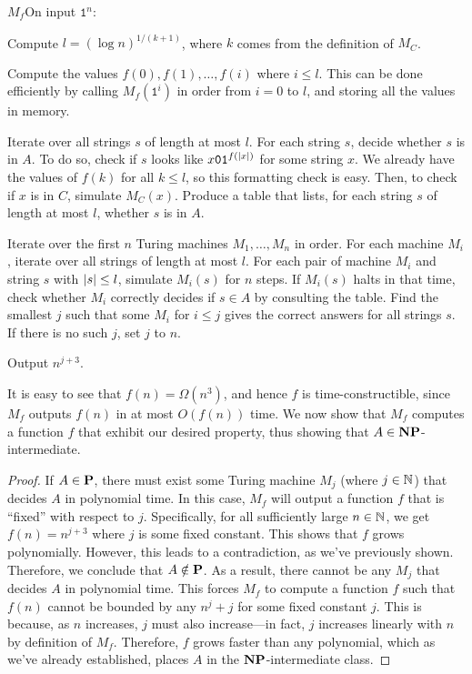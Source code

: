\documentclass[11pt,twoside=off,numbers=noenddot]{scrbook}
\begin{document}
\begin{turing}{$M_f$}{On input $\texttt{1}^n$:}
\item Compute $l = (\log n)^{1 / (k + 1)}$, where $k$ comes from the definition of $M_C$.
\item Compute the values $f(0), f(1), \dots, f(i)$ where $i \leq l$. This can be done efficiently by calling $M_f(\texttt{1}^i)$ in order from $i = 0$ to $l$, and storing all the values in memory.
\item Iterate over all strings $s$ of length at most $l$. For each string $s$, decide whether $s$ is in $A$. To do so, check if $s$ looks like $x\texttt{0}\texttt{1}^{f(| x |)}$ for some string $x$. We already have the values of $f(k)$ for all $k \leq l$, so this formatting check is easy. Then, to check if $x$ is in $C$, simulate $M_C(x)$. Produce a table that lists, for each string $s$ of length at most $l$, whether $s$ is in $A$.
\item Iterate over the first $n$ Turing machines $M_1, \dots, M_n$ in order. For each machine $M_i$, iterate over all strings of length at most $l$. For each pair of machine $M_i$ and string $s$ with $| s | \leq l$, simulate $M_i(s)$ for $n$ steps. If $M_i(s)$ halts in that time, check whether $M_i$ correctly decides if $s \in A$ by consulting the table. Find the smallest $j$ such that some $M_i$ for $i \leq j$ gives the correct answers for all strings $s$. If there is no such $j$, set $j$ to $n$.
\item Output $n^{j + 3}$.
\end{turing}

It is easy to see that $f(n) = \Omega(n^3)$, and hence $f$ is time-constructible, since $M_f$ outputs $f(n)$ in at most $O(f(n))$ time. We now show that $M_f$ computes a function $f$ that exhibit our desired property, thus showing that $A \in \textbf{NP}$-intermediate.

\begin{proof}
  If $A \in \textbf{P}$, there must exist some Turing machine $M_j$ (where $j \in \mathbb N$) that decides $A$ in polynomial time. In this case, $M_f$ will output a function $f$ that is ``fixed'' with respect to $j$. Specifically, for all sufficiently large $n \in \mathbb N$, we get $f(n) = n^{j + 3}$ where $j$ is some fixed constant. This shows that $f$ grows polynomially. However, this leads to a contradiction, as we've previously shown. Therefore, we conclude that $A \notin \textbf{P}$. As a result, there cannot be any $M_j$ that decides $A$ in polynomial time. This forces $M_f$ to compute a function $f$ such that $f(n)$ cannot be bounded by any $n^j + j$ for some fixed constant $j$. This is because, as $n$ increases, $j$ must also increase—in fact, $j$ increases linearly with $n$ by definition of $M_f$. Therefore, $f$ grows faster than any polynomial, which as we've already established, places $A$ in the $\textbf{NP}$-intermediate class.
\end{proof}
\end{document}
